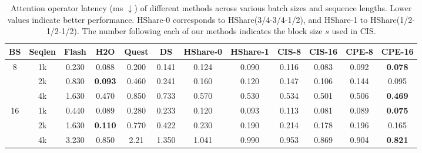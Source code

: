 \begin{table}[t]
\centering
\caption{Attention operator latency (ms $\downarrow$) of different methods across various batch sizes and sequence lengths. Lower values indicate better performance. HShare-0 corresponds to HShare(3/4-3/4-1/2), and HShare-1 to HShare(1/2-1/2-1/2). The number following each of our methods indicates the block size $s$ used in CIS.}
\label{tab:attention_latency}
\begin{tabular}{cccccccc|cccc}
\toprule
BS & Seqlen & Flash & H2O \cite{zhang2023h2o} & Quest \cite{tang2406quest} & DS \cite{yang2024post} & HShare-0 \cite{wuhshare} & HShare-1 \cite{wuhshare} & CIS-8 & CIS-16 & CPE-8 & CPE-16 \\
\midrule
\multirow{3}{*}{8}
  & 1k & 0.230 & 0.088 & 0.200 & 0.141 & 0.124 & 0.090 & 0.116 & 0.083 & 0.092 & \textbf{0.078}\\
  & 2k & 0.830 & \textbf{0.093} & 0.460 & 0.241 & 0.160 & 0.120 & 0.147 & 0.106 & 0.144 & 0.095 \\
  & 4k & 1.630 & 0.470 & 0.850 & 0.733 & 0.570 & 0.530 & 0.534 & 0.501 & 0.506 & \textbf{0.469} \\
\midrule
\multirow{3}{*}{16}
  & 1k & 0.440 & 0.089 & 0.280 & 0.233 & 0.120 & 0.093 & 0.113 & 0.081 & 0.089 & \textbf{0.075} \\
  & 2k & 1.630 & \textbf{0.110} & 0.770 & 0.422 & 0.230 & 0.190 & 0.214 & 0.178 & 0.196 & 0.165 \\
  & 4k & 3.230 & 0.850 & 2.21  & 1.350 & 1.041 & 0.990 & 0.953 & 0.869 & 0.904 & \textbf{0.821} \\
\bottomrule
\end{tabular}
\end{table}

